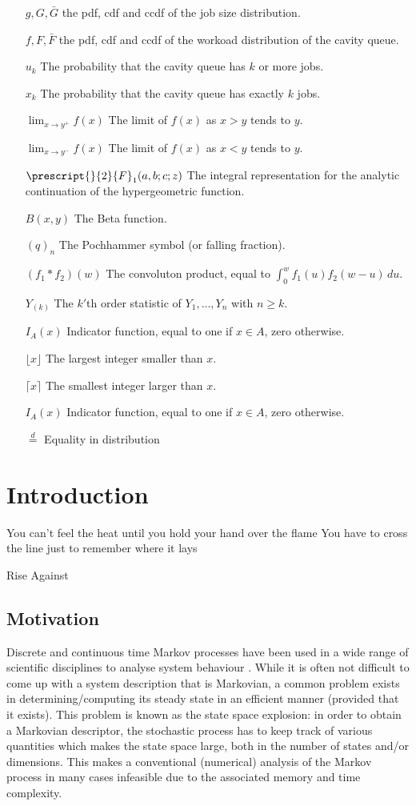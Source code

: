 \documentclass[12pt]{report}
\begin{document}
\begin{itemize}
\item[$g, G, \bar G$] the pdf, cdf and ccdf of the job size distribution.
\item[$f, F, \bar F$] the pdf, cdf and ccdf of the workoad distribution of the cavity queue.
\item[$u_k$] The probability that the cavity queue has $k$ or more jobs.
\item[$x_k$] The probability that the cavity queue has exactly $k$ jobs.
\item[$\lim_{x \rightarrow y^+} f(x)$] The limit of $f(x)$ as $x > y$ tends to $y$.
\item[$\lim_{x \rightarrow y^-} f(x)$] The limit of $f(x)$ as $x < y$ tends to $y$.
\item[$\prescript{}{2}{F}_1(a,b;c;z)$] The integral representation for the analytic continuation of the hypergeometric function.
\item[$B(x,y)$] The Beta function.
\item[$(q)_n$] The Pochhammer symbol (or falling fraction).
\item[$(f_1 * f_2) (w)$] The convoluton product, equal to $\int_0^w f_1(u) f_2(w-u) \, du$.
\item[$Y_{(k)}$] The $k'$th order statistic of $Y_1,\dots, Y_n$ with $n \geq k$.
\item[$I_A(x)$] Indicator function, equal to one if $x \in A$, zero otherwise.
\item[$\lfloor x \rfloor$] The largest integer smaller than $x$.
\item[$\lceil x \rceil$] The smallest integer larger than $x$.
\item[$I_A(x)$] Indicator function, equal to one if $x \in A$, zero otherwise.
\item[$\overset{d}{=}$] Equality in distribution
\end{itemize}

\chapter{Introduction}
\epigraph{You can't feel the heat until you hold your hand over the flame
	You have to cross the line just to remember where it lays}{Rise Against}

\section{Motivation}
Discrete and continuous time Markov processes have been used in a wide range of scientific disciplines to analyse system behaviour \cite{pinsky2010introduction, norris1998markov, harchol2013performance}. While it is often not difficult to come
up with a system description that is Markovian, a common problem exists in
determining/computing its steady state in an efficient manner (provided that it exists). This
problem is known as the state space explosion: in order to obtain a Markovian descriptor, the
stochastic process has to keep track of various quantities which makes the state space large, both
in the number of states and/or dimensions. This makes a conventional (numerical) analysis of the
Markov process in many cases infeasible due to the associated memory and time complexity.
\end{document}
